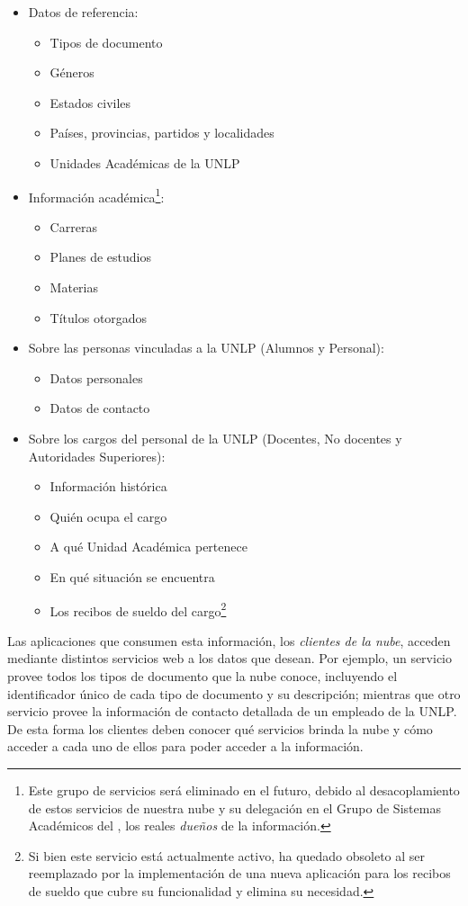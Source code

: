 \begin{itemize}
  \item Datos de referencia:
  \begin{itemize}
    \item Tipos de documento
    \item Géneros
    \item Estados civiles
    \item Países, provincias, partidos y localidades
    \item Unidades Académicas de la UNLP
  \end{itemize}
  \item Información académica\footnote{Este grupo de servicios será eliminado en el futuro, debido al desacoplamiento de estos servicios de nuestra nube y su delegación en el Grupo de Sistemas Académicos del {\cespi}, los reales \textit{dueños} de la información.}:
  \begin{itemize}
    \item Carreras
    \item Planes de estudios
    \item Materias
    \item Títulos otorgados
  \end{itemize}
  \item Sobre las personas vinculadas a la UNLP (Alumnos y Personal):
  \begin{itemize}
    \item Datos personales
    \item Datos de contacto
  \end{itemize}
  \item Sobre los cargos del personal de la UNLP (Docentes, No docentes y Autoridades Superiores):
  \begin{itemize}
    \item Información histórica
    \item Quién ocupa el cargo
    \item A qué Unidad Académica pertenece
    \item En qué situación se encuentra
    \item Los recibos de sueldo del cargo\footnote{Si bien este servicio está actualmente activo, ha quedado obsoleto al ser reemplazado por la implementación de una nueva aplicación para los recibos de sueldo que cubre su funcionalidad y elimina su necesidad.}
  \end{itemize}
\end{itemize}

Las aplicaciones que consumen esta información, los \textit{clientes de la nube}, acceden mediante distintos servicios web a los datos que desean. Por ejemplo, un servicio provee todos los tipos de documento que la nube conoce, incluyendo el identificador único de cada tipo de documento y su descripción; mientras que otro servicio provee la información de contacto detallada de un empleado de la UNLP. De esta forma los clientes deben conocer qué servicios brinda la nube y cómo acceder a cada uno de ellos para poder acceder a la información.

